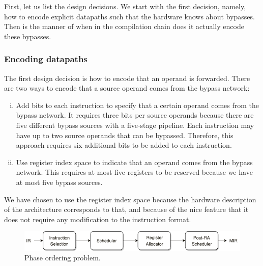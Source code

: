 
First, let us list the design decisions. We start with the first decision, namely, how to encode explicit datapaths such that the hardware knows about bypasses. Then is the manner of when in the compilation chain does it actually encode these bypasses.


\subsubsection{Encoding datapaths}
The first design decision is how to encode that an operand is forwarded. There are two ways to encode that a source operand comes from the bypass network:
\begin{enumerate}[i.]
  \item Add bits to each instruction to specify that a certain operand comes from the bypass network. It requires three bits per source operands because there are five different bypass sources with a five-stage pipeline. Each instruction may have up to two source operands that can be bypassed. Therefore, this approach requires six additional bits to be added to each instruction.
  \item Use register index space to indicate that an operand comes from the bypass network. This requires at most five registers to be reserved because we have at most five bypass sources.
\end{enumerate} 

We have chosen to use the register index space because the hardware description of the architecture corresponds to that, and because of the nice feature that it does not require any modification to the instruction format.

\begin{figure}[b]
\centering
\includegraphics[width=.9\textwidth]{figures/phase_ordering}
\caption{Phase ordering problem.}
\label{fig:phase_ordering}
\end{figure}

